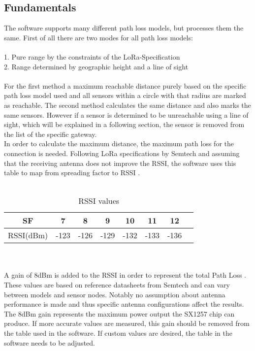 \documentclass[12pt,a4paper]{article}
\begin{document}
\subsection{Fundamentals}
The software supports many different path loss models, but processes them the same. First of all there are two modes for all path loss models:\\
\\
1. Pure range by the constraints of the LoRa-Specification\\
2. Range determined by geographic height and a line of sight\\
\\
For the first method a maximum reachable distance purely based on the specific path loss model used and all sensors within a circle with that radius are marked as reachable.
The second method calculates the same distance and also marks the same sensors. However if a sensor is determined to be unreachable using a line of sight, which will be explained in a following section, the sensor is removed from the list of the specific gateway.\\
In order to calculate the maximum distance, the maximum path loss for the connection is needed. Following LoRa specifications by Semtech and assuming that the receiving antenna does not improve the RSSI, the software uses this table to map from spreading factor to RSSI \cite{sx1276}.\\
\\
\begin{table}[!th]
	\centering
	\caption{RSSI values}
\begin{tabular}{|c|c|c|c|c|c|c|c|}
	\hline
	SF&7&8&9&10&11&12 \\ \hline
	RSSI(dBm)&-123&-126&-129&-132&-133&-136\\
	\hline
\end{tabular}
\end{table}
\\
\\A gain of 8dBm is added to the RSSI in order to represent the total Path Loss \cite{sx1257}. These values are based on reference datasheets from Semtech and can vary between models and sensor nodes. Notably no assumption about antenna performance is made and thus specific antenna configurations affect the results. The 8dBm gain represents the maximum power output the SX1257 chip can produce. If more accurate values are measured, this gain should be removed from the table used in the software. If custom values are desired, the table in the software needs to be adjusted.
\end{document}
